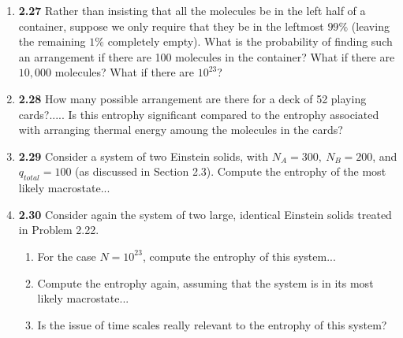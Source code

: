 \documentclass[fleqn]{article}
\begin{document}
  \begin{enumerate}
    \item \textbf{2.27} Rather than insisting that all the molecules be in the left half of a container, suppose we only require 
    that they be in the leftmost $99\%$ (leaving the remaining $1\%$ completely empty). What is the probability of finding such an
    arrangement if there are 100 molecules in the container? What if there are $10,000$ molecules? What if there are $10^{23}$?


    \item \textbf{2.28} How many possible arrangement are there for a deck of 52 playing cards?..... Is this entrophy significant
    compared to the entrophy associated with arranging thermal energy amoung the molecules in the cards?


    \item \textbf{2.29} Consider a system of two Einstein  solids, with $N_A=300, ~ N_B=200$, and $q_{total}=100$ (as discussed in Section
    2.3). Compute the entrophy of the most likely macrostate...


    \item \textbf{2.30} Consider again the system of two large, identical Einstein solids treated in Problem 2.22.
    \begin{enumerate}
      \item For the case $N=10^{23}$, compute the entrophy of this system...


      \item Compute the entrophy again, assuming that the system is in its most likely macrostate...


      \item Is the issue of time scales really relevant to the entrophy of this system?

      

\end{enumerate}
\end{enumerate}
\end{document}
